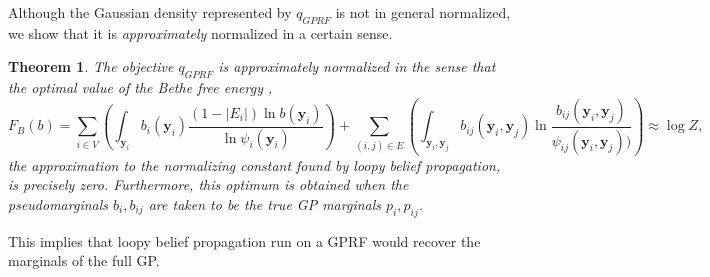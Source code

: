 \documentclass{article}
\newtheorem{theorem}{Theorem}
\renewcommand{\v}[1]{\mathbf{#1}}
\begin{document}
Although the Gaussian density represented by $q_{GPRF}$ is not in general normalized, we show that it is {\em
  approximately} normalized in a certain sense. 

\begin{theorem}
The objective $q_{GPRF}$ is approximately normalized in the sense that
the optimal value of the {\em Bethe free energy} \cite{yedidia2001bethe}, 
\begin{equation}
F_B(b) = \sum_{i\in V} \left(\int_{\v{y}_i} b_i(\v{y}_i) \frac{(1-|E_i|)\ln
    b(\v{y}_i)}{\ln \psi_i(\v{y}_i)}\right)  + \sum_{(i,j)\in E} \left(\int_{\v{y}_i, \v{y}_j} b_{ij}(\v{y}_i,
  \v{y}_j) \ln \frac{b_{ij}(\v{y}_i,
  \v{y}_j)}{\psi_{ij}(\v{y}_i, \v{y}_j))}\right)
\label{eqn:bethe-energy} \approx \log Z,
\end{equation}
the approximation to the normalizing constant found by loopy belief
propagation, is precisely zero. Furthermore, this
optimum is obtained when the pseudomarginals $b_i, b_{ij}$ are
taken to be the true GP marginals $p_i, p_{ij}$. 
\end{theorem}

This implies that loopy belief propagation run on a GPRF
would recover the marginals of the full GP.
\end{document}
